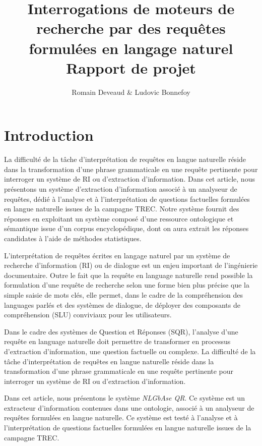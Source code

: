 \documentclass[10pt,a4paper]{article}
\title{\Large\bf Interrogations de moteurs de recherche par des requêtes formulées en langage naturel \\ 
  Rapport de projet}
\author{Romain Deveaud \& Ludovic Bonnefoy}
\begin{document}
\parindent=0pt

\maketitle
\newpage
\newpage
\tableofcontents
\newpage

\section{Introduction}
\par La difficulté de la tâche d'interprétation de requêtes en langue naturelle réside dans la transformation d'une phrase grammaticale en une requête pertinente pour interroger un système de RI ou d'extraction d'information. Dans cet article, nous présentons un système d'extraction d'information associé à un analyseur de requêtes, dédié à l'analyse et à l'interprétation de questions factuelles formulées en langue naturelle issues de la campagne TREC. Notre système fournit des réponses en exploitant un système composé d'une ressource ontologique et sémantique issue d'un corpus encyclopédique, dont on aura extrait les réponses candidates à l'aide de méthodes statistiques.
\par L'interprétation de requêtes écrites en langage naturel par un système de recherche d'information (RI) ou de dialogue est un enjeu important de l'ingénierie documentaire. Outre le fait que la requête en language naturelle rend possible la formulation d'une requête de recherche selon une forme bien plus précise que la simple saisie de mots clés, elle permet, dans le cadre de la compréhension des languages parlés et des systèmes de dialogue, de déployer des composants de compréhension (SLU) conviviaux pour les utilisateurs. 

\par Dans le cadre des systèmes de Question et Réponses (SQR), l'analyse d'une requête en language naturelle doit permettre de transformer en processus d'extraction d'information, une question factuelle ou complexe. La difficulté de la tâche d'interprétation de requêtes en langue naturelle réside dans la transformation d'une phrase grammaticale en une requête pertinente pour interroger un système de RI ou d'extraction d'information. 

\par Dans cet article, nous présentons le système \textit{NLGbAse QR}. Ce système est un extracteur d'information contenues dans une ontologie, associé à un analyseur de requêtes formulées en langue naturelle. Ce système est testé à l'analyse et à l'interprétation de questions factuelles formulées en langue naturelle issues de la campagne TREC. 
\end{document}

